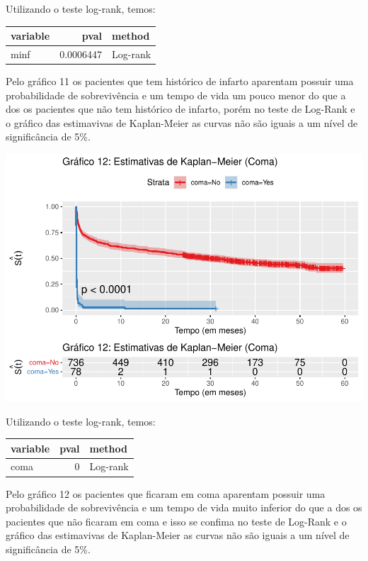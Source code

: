 \documentclass[]{article}
\begin{document}
\newpage

Utilizando o teste log-rank, temos:

\begin{longtable}[]{@{}lrl@{}}
\toprule
variable & pval & method\tabularnewline
\midrule
\endhead
minf & 0.0006447 & Log-rank\tabularnewline
\bottomrule
\end{longtable}

Pelo gráfico 11 os pacientes que tem histórico de infarto aparentam
possuir uma probabilidade de sobrevivência e um tempo de vida um pouco
menor do que a dos os pacientes que não tem histórico de infarto, porém
no teste de Log-Rank e o gráfico das estimavivas de Kaplan-Meier as
curvas não são iguais a um nível de significância de 5\%.

\begin{center}\includegraphics[width=0.8\linewidth]{Atividade_3_files/figure-latex/unnamed-chunk-11-1} \end{center}

Utilizando o teste log-rank, temos:

\begin{longtable}[]{@{}lrl@{}}
\toprule
variable & pval & method\tabularnewline
\midrule
\endhead
coma & 0 & Log-rank\tabularnewline
\bottomrule
\end{longtable}

Pelo gráfico 12 os pacientes que ficaram em coma aparentam possuir uma
probabilidade de sobrevivência e um tempo de vida muito inferior do que
a dos os pacientes que não ficaram em coma e isso se confima no teste de
Log-Rank e o gráfico das estimavivas de Kaplan-Meier as curvas não são
iguais a um nível de significância de 5\%.
\end{document}

